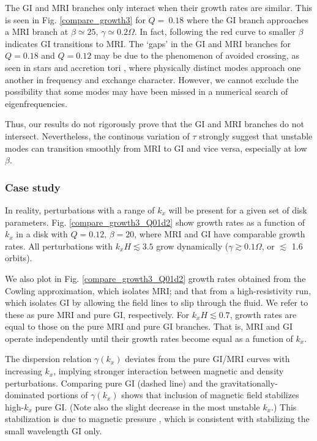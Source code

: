 The GI and MRI branches only interact when their growth rates
are similar. This is seen in Fig. \ref{compare_growth3} for $Q=~0.18$
where the GI branch approaches a MRI branch at $\beta\simeq 25,\,
\gamma\simeq 0.2\Omega$. In fact, following the red curve to smaller
$\beta$ indicates GI transitions to MRI. The
`gaps' in the GI and MRI branches for $Q=0.18$ and $Q=0.12$ may be due
to the phenomenon of avoided crossing, as seen in stars
\citep[e.g.][]{aizenman77} and accretion tori
\citep[e.g.][]{christo93}, where physically distinct modes approach
one another in frequency and exchange character. However, we cannot
exclude the possibility  that some modes may have been missed in a 
numerical search of eigenfrequencies.  

Thus, our results do not rigorously prove that the GI and MRI branches
do not intersect.  Nevertheless, the continous variation of $\tau$
strongly suggest that unstable modes can transition smoothly from 
MRI to GI and vice versa, especially at low $\beta$.     

\subsubsection{Case study} 
In reality, perturbations with a range of $k_x$ will be present for a
given set of disk parameters. Fig. \ref{compare_growth3_Q01d2} show
growth rates as a function of $k_x$ in a disk with
$Q=0.12,\,\beta=20$, where MRI and GI have comparable growth
rates. All perturbations with $k_xH \lesssim 3.5$ grow dynamically
($\gamma\gtrsim 0.1\Omega$, or $\lesssim$ 1.6 orbits).

We also plot in Fig. \ref{compare_growth3_Q01d2} growth rates obtained 
from the Cowling approximation, which isolates MRI; and that from a
high-resistivity run, which isolates GI by allowing the field lines to
slip through the fluid. We refer to these as  
pure MRI and pure GI, respectively.  
For $k_xH\lesssim 0.7$, growth rates are equal to
those on the pure MRI and pure GI branches. That is, MRI and GI
operate independently until their growth rates become equal as a
function of $k_x$.  

The dispersion relation $\gamma(k_x)$ deviates from the
pure GI/MRI curves with increasing $k_x$, implying stronger interaction between
magnetic and density perturbations. Comparing pure GI (dashed line)
and the gravitationally-dominated portions of $\gamma(k_x)$ shows that 
inclusion of magnetic field stabilizes high-$k_x$ pure GI. (Note also
the slight decrease in the most unstable $k_x$.) 
This stabilization is due to magnetic pressure \citep{lizano10}, which
is consistent with stabilizing the small wavelength GI only.    

